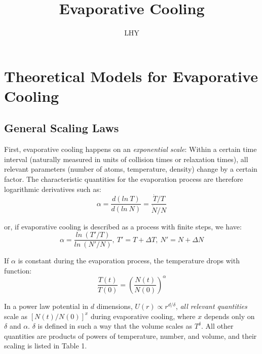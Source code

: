 \documentclass[12]{article}
\title{Evaporative Cooling }\author{LHY}
\begin{document}
\maketitle%
\setcounter{page}{0}%
\thispagestyle{empty}%
\renewcommand{\abstractname}{\Large \textbf%
{Abstract}\\}%


\newpage
\section{Theoretical Models for Evaporative Cooling}
\subsection{General Scaling Laws}
First, evaporative cooling happens on an\textit{ exponential scale}: Within a certain time interval (naturally measured in units of collision times or relaxation times), all relevant parameters (number of atoms, temperature, density) change by a certain factor. The characteristic quantities for the evaporation process are therefore logarithmic derivatives such as: $$\alpha = \frac{d(ln\ T)}{d(ln\ N)} = \frac{\dot{T}/T}{\dot{N}/N}$$
  
  
  or, if evaporative cooling is described as a process with finite steps, we have: $$\alpha = \frac{ln\ (T'/T)}{ln\ (N'/N)},\ T'=T + \Delta T,\ N'=N+\Delta N$$
  
  If $\alpha$ is constant during the evaporation process, the temperature drops with function: $$\frac{T(t)}{T(0)}=(\frac{N(t)}{N(0)})^{\alpha} $$
  
  In a power law potential in $d$ dimensions, $U(r)\propto r^{d/\delta}$,\textit{ all relevant quantities} scale as $[N(t)/N(0)]^x $ during evaporative cooling, where $x$ depends only on $\delta$ and $\alpha$. $\delta$ is defined in such a way that the volume scales as $T^\delta$. All other quantities are products of powers of temperature, number, and volume, and their scaling is listed in Table 1.
\end{document}
